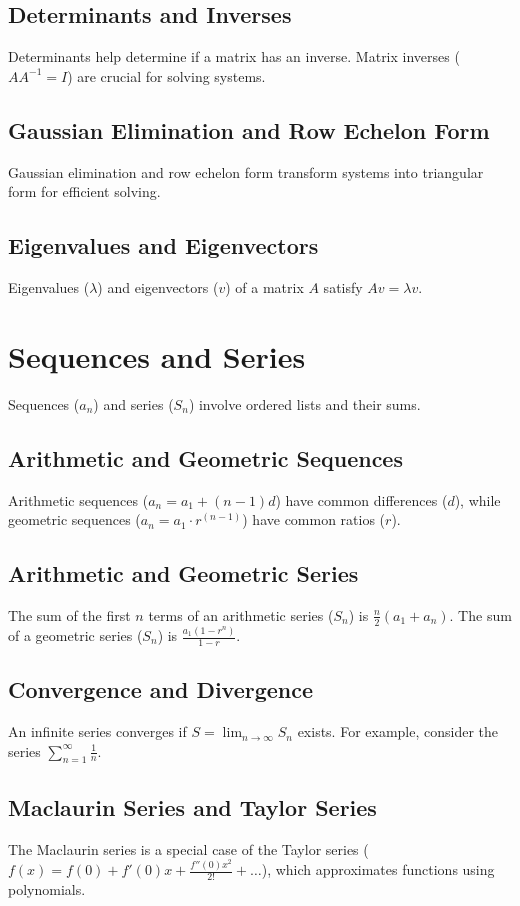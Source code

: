 \documentclass{article}
\begin{document}
\subsection{Determinants and Inverses}
Determinants help determine if a matrix has an inverse. Matrix inverses (\(AA^{-1} = I\)) are crucial for solving systems.

\subsection{Gaussian Elimination and Row Echelon Form}
Gaussian elimination and row echelon form transform systems into triangular form for efficient solving.

\subsection{Eigenvalues and Eigenvectors}
Eigenvalues (\(\lambda\)) and eigenvectors (\(v\)) of a matrix \(A\) satisfy \(Av = \lambda v\).

\section{Sequences and Series}
Sequences (\(a_n\)) and series (\(S_n\)) involve ordered lists and their sums.

\subsection{Arithmetic and Geometric Sequences}
Arithmetic sequences (\(a_n = a_1 + (n - 1)d\)) have common differences (\(d\)), while geometric sequences (\(a_n = a_1 \cdot r^{(n - 1)}\)) have common ratios (\(r\)).

\subsection{Arithmetic and Geometric Series}
The sum of the first \(n\) terms of an arithmetic series (\(S_n\)) is \(\frac{n}{2}(a_1 + a_n)\). The sum of a geometric series (\(S_n\)) is \(\frac{a_1(1 - r^n)}{1 - r}\).

\subsection{Convergence and Divergence}
An infinite series converges if \(S = \lim_{n \to \infty} S_n\) exists. For example, consider the series \(\sum_{n=1}^{\infty} \frac{1}{n}\).

\subsection{Maclaurin Series and Taylor Series}
The Maclaurin series is a special case of the Taylor series (\(f(x) = f(0) + f'(0)x + \frac{f''(0)x^2}{2!} + \ldots\)), which approximates functions using polynomials.
\end{document}
